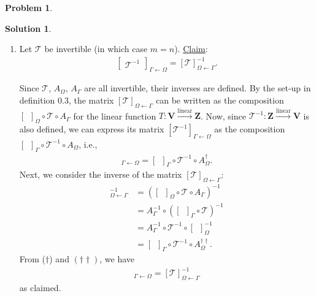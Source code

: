 \documentclass{article}
\theoremstyle{definition}
\newtheorem*{prob*}{Problem}
\newtheorem*{sln*}{Solution}
\newcommand{\V}{\mathbf{V}}
\newcommand{\Z}{\mathbf{Z}}
\newcommand{\lin}{\overset{\text{linear}}{\longrightarrow}}
\newcommand{\T}{\mathcal{T}}
\begin{document}
\begin{prob*}
\begin{sln*}
\begin{enumerate}
			\item Let $\T$ be invertible (in which case $m=n$). \underline{Claim}:
			\begin{align*}
			\begin{bmatrix}
			\mathcal{T}^{-1}
			\end{bmatrix}_{\Gamma\leftarrow\Omega} = [\mathcal{T}]^{-1}_{\Omega\leftarrow \Gamma}.
			\end{align*}
			
			Since $\T$, $A_{\Omega}$, $A_\Gamma$ are all invertible, their inverses are defined. By the set-up in definition 0.3, the matrix $[\T]_{\Omega\leftarrow\Gamma}$ can be written as the composition $[\,\,\,]_\Omega \circ \T \circ A_{\Gamma}$ for the linear function $T : \V \lin \Z$. Now, since $\T^{-1} : \Z \lin \V$ is also defined, we can express its matrix $[\T^{-1}]_{\Gamma\leftarrow\Omega}$ as the composition $[\,\,\,]_\Gamma\circ \T^{-1} \circ A_\Omega$, i.e.,
			\begin{align*}
			[\T^{-1}]_{\Gamma\leftarrow\Omega} = [\,\,\,]_\Gamma\circ \T^{-1} \circ A_\Omega^\dagger.
			\end{align*}
			Next, we consider the inverse of the matrix $[\T]_{\Omega\leftarrow\Gamma}$:
			\begin{align*}
			[\T]^{-1}_{\Omega\leftarrow\Gamma} &= \left([\,\,\,]_\Omega\circ \T \circ A_\Gamma \right)^{-1}\\
			&= A^{-1}_\Gamma \circ \left( [\,\,\,]_\Gamma \circ \T \right)^{-1}\\
			&= A^{-1}_\Gamma \circ \T^{-1} \circ [\,\,\,]_\Omega^{-1}\\
			&= [\,\,\,]_\Gamma \circ \T^{-1} \circ A_\Omega^{\dagger\dagger}.
			\end{align*}
			From ($\dagger$) and $(\dagger\dagger)$, we have
			\begin{align*}
				[\T^{-1}]_{\Gamma\leftarrow\Omega} = [\T]^{-1}_{\Omega\leftarrow\Gamma}
			\end{align*}
			as claimed.
			
		\end{enumerate}
	\end{sln*}




\end{prob*}

\newpage
\end{document}
